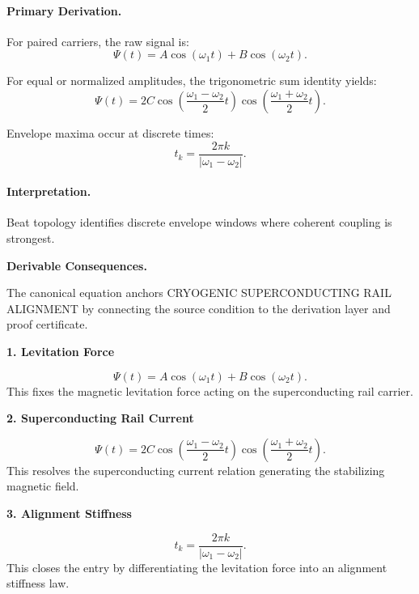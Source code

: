 \paragraph{Primary Derivation.}
For paired carriers, the raw signal is:
\begin{equation}
\Psi(t)=A\cos(\omega_1t)+B\cos(\omega_2t).
\end{equation}

For equal or normalized amplitudes, the trigonometric sum identity yields:
\begin{equation}
\Psi(t)
=
2C
\cos\left(
\frac{\omega_1-\omega_2}{2}t
\right)
\cos\left(
\frac{\omega_1+\omega_2}{2}t
\right).
\end{equation}

Envelope maxima occur at discrete times:
\begin{equation}
\boxed{
t_k=
\frac{2\pi k}{|\omega_1-\omega_2|}.
}
\end{equation}

\paragraph{Interpretation.}
Beat topology identifies discrete envelope windows where coherent coupling is strongest.

\par\vspace{0.35em}
\noindent\textbf{Derivable Consequences.}\quad
\begingroup
\footnotesize
\raggedright
The canonical equation anchors CRYOGENIC SUPERCONDUCTING RAIL ALIGNMENT by connecting the source condition to the derivation layer and proof certificate.
\par\endgroup

\noindent\textbf{1. Levitation Force}\par
\[
\Psi(t)=A\cos(\omega_1t)+B\cos(\omega_2t).
\]
\noindent This fixes the magnetic levitation force acting on the superconducting rail carrier.\par
\noindent\textbf{2. Superconducting Rail Current}\par
\[
\Psi(t) = 2C \cos\left( \frac{\omega_1-\omega_2}{2}t \right) \cos\left( \frac{\omega_1+\omega_2}{2}t \right).
\]
\noindent This resolves the superconducting current relation generating the stabilizing magnetic field.\par
\noindent\textbf{3. Alignment Stiffness}\par
\[
t_k= \frac{2\pi k}{|\omega_1-\omega_2|}.
\]
\noindent This closes the entry by differentiating the levitation force into an alignment stiffness law.\par

